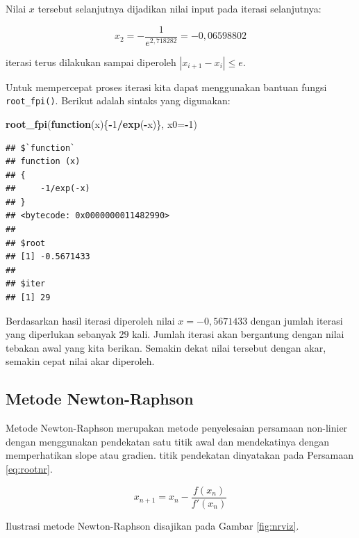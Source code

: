 \documentclass[]{book}
\newenvironment{Shaded}{\begin{snugshade}}{\end{snugshade}}
\newcommand{\ControlFlowTok}[1]{\textcolor[rgb]{0.13,0.29,0.53}{\textbf{#1}}}
\newcommand{\DataTypeTok}[1]{\textcolor[rgb]{0.13,0.29,0.53}{#1}}
\newcommand{\DecValTok}[1]{\textcolor[rgb]{0.00,0.00,0.81}{#1}}
\newcommand{\KeywordTok}[1]{\textcolor[rgb]{0.13,0.29,0.53}{\textbf{#1}}}
\newcommand{\NormalTok}[1]{#1}
\newcommand{\OperatorTok}[1]{\textcolor[rgb]{0.81,0.36,0.00}{\textbf{#1}}}
\theoremstyle{definition}
\theoremstyle{definition}
\theoremstyle{definition}
\theoremstyle{remark}
\begin{document}
Nilai \(x\) tersebut selanjutnya dijadikan nilai input pada iterasi selanjutnya:

\[
x_2 = -\frac{1}{e^{2,718282}}=-0,06598802
\]

iterasi terus dilakukan sampai diperoleh \(\left| x_{i+1}-x_i \right|\le e\).

Untuk mempercepat proses iterasi kita dapat menggunakan bantuan fungsi \texttt{root\_fpi()}. Berikut adalah sintaks yang digunakan:

\begin{Shaded}
\begin{Highlighting}[]
\KeywordTok{root_fpi}\NormalTok{(}\ControlFlowTok{function}\NormalTok{(x)\{}\OperatorTok{-}\DecValTok{1}\OperatorTok{/}\KeywordTok{exp}\NormalTok{(}\OperatorTok{-}\NormalTok{x)\}, }\DataTypeTok{x0=}\OperatorTok{-}\DecValTok{1}\NormalTok{)}
\end{Highlighting}
\end{Shaded}

\begin{verbatim}
## $`function`
## function (x) 
## {
##     -1/exp(-x)
## }
## <bytecode: 0x0000000011482990>
## 
## $root
## [1] -0.5671433
## 
## $iter
## [1] 29
\end{verbatim}

Berdasarkan hasil iterasi diperoleh nilai \(x=-0,5671433\) dengan jumlah iterasi yang diperlukan sebanyak \(29\) kali. Jumlah iterasi akan bergantung dengan nilai tebakan awal yang kita berikan. Semakin dekat nilai tersebut dengan akar, semakin cepat nilai akar diperoleh.

\hypertarget{newtonraphson}{%
\subsection{Metode Newton-Raphson}\label{newtonraphson}}

Metode Newton-Raphson merupakan metode penyelesaian persamaan non-linier dengan menggunakan pendekatan satu titik awal dan mendekatinya dengan memperhatikan slope atau gradien. titik pendekatan dinyatakan pada Persamaan \eqref{eq:rootnr}.

\begin{equation}
x_{n+1}=x_n-\frac{f\left(x_n\right)}{f'\left(x_n\right)}
  \label{eq:rootnr}
\end{equation}

Ilustrasi metode Newton-Raphson disajikan pada Gambar \ref{fig:nrviz}.
\end{document}
